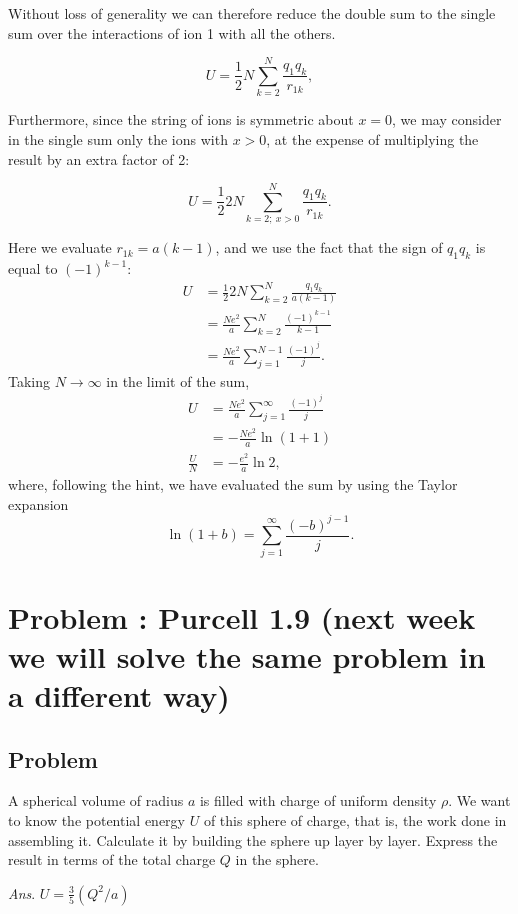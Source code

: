 \documentclass[solutions]{esg8022pset}
\begin{document}
  Without loss of generality we can therefore reduce the double sum to the single sum over the interactions of ion 1 with all the others.

  $$U = \frac12 N\sum_{k=2}^N \frac{q_1 q_k}{r_{1k}},$$

  Furthermore, since the string of ions is symmetric about $x = 0$, we may consider in the single sum only the ions with $x > 0$, at the expense of multiplying the result by an extra factor of 2:

  $$U = \frac12 2N \sum_{k = 2;\ x > 0}^N \frac{q_1 q_k}{r_{1k}}.$$

  Here we evaluate $r_{1k} = a(k-1)$, and we use the fact that the sign of $q_1 q_k$ is equal to $(-1)^{k-1}$:
  \begin{align*}
    U & = \frac12 2N \sum_{k = 2}^N \frac{q_1 q_k}{a(k-1)} \\
      & = \frac{N e^2}{a} \sum_{k=2}^N \frac{(-1)^{k-1}}{k-1} \\
      & = \frac{N e^2}{a} \sum_{j=1}^{N-1} \frac{(-1)^j}{j}.
  \end{align*}
  Taking $N \to\infty$ in the limit of the sum,
  \begin{align*}
    U & = \frac{N e^2}{a} \sum_{j=1}^\infty \frac{(-1)^j}{j} \\
      & = -\frac{N e^2}{a}\ln(1 + 1) \\
    \frac{U}{N} & = -\frac{e^2}{a}\ln 2,
  \end{align*}
  where, following the hint, we have evaluated the sum by using the Taylor expansion
  $$\ln(1 + b) = \sum_{j=1}^\infty \frac{(-b)^{j-1}}{j}.$$
\section{Problem \thesection: Purcell 1.9 (next week we will solve the same problem in a different way)}
\subsection{Problem}
  A spherical volume of radius $a$ is filled with charge of uniform density $\rho$. We want to know the potential energy $U$ of this sphere of charge, that is, the work done in assembling it. Calculate it by building the sphere up layer by layer.  Express the result in terms of the total charge $Q$ in the sphere.
  \begin{flushright}\emph{Ans}. $U = \frac35 (Q^2 / a)$\end{flushright}
\end{document}
